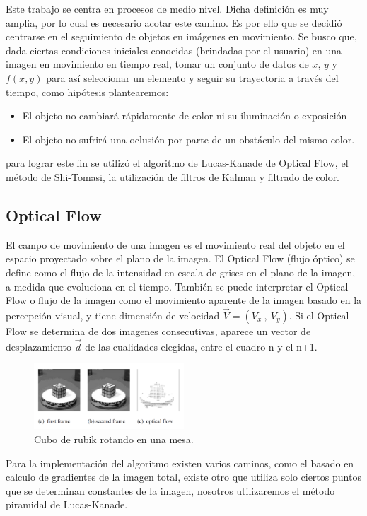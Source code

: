 Este trabajo se centra en procesos de medio nivel. Dicha definición es muy amplia, por lo cual es necesario acotar este camino. Es por ello que se decidió centrarse en el seguimiento de objetos en imágenes en movimiento. Se busco que, dada ciertas condiciones iniciales conocidas (brindadas por el usuario) en una imagen en movimiento en tiempo real, tomar un conjunto de datos de $x$, $y$ y $f(x,y)$ para así seleccionar un elemento y seguir su trayectoria a través del tiempo, como hipótesis plantearemos:
\begin{itemize}
\item El objeto no cambiará rápidamente de color ni su iluminación o exposición-
\item El objeto no sufrirá una oclusión por parte de un obstáculo del mismo color.
\end{itemize} para lograr este fin se utilizó el algoritmo de Lucas-Kanade de Optical Flow, el método de Shi-Tomasi, la utilización de filtros de Kalman y filtrado de color.
\subsection{Optical Flow} 
El campo de movimiento de una imagen es el movimiento real del objeto en el espacio proyectado sobre el plano de la imagen. El Optical Flow (flujo óptico) se define como el flujo de la intensidad en escala de grises en el plano de la imagen, a medida que evoluciona en el tiempo. También se puede interpretar el Optical Flow o flujo de la imagen como el movimiento aparente de la imagen  basado en la percepción visual, y tiene dimensión de velocidad $\vec{V}= (V_x \ , \ V_y)$. Si el Optical Flow se determina de dos imagenes consecutivas, aparece un vector de desplazamiento $\vec{d}$ de las cualidades elegidas, entre el cuadro n y el n+1.
\begin{figure}[H]
		\centering
		\includegraphics[width=0.5\textwidth]{Imagenes/opticalflowrubick.png}
		\caption{Cubo de rubik rotando en una mesa.}
		\label{fig:opticalflow1}
\end{figure}
Para la implementación del algoritmo existen varios caminos, como el basado en calculo de gradientes de la imagen total, existe otro que utiliza solo ciertos puntos que se determinan constantes de la imagen, nosotros utilizaremos el método piramidal de Lucas-Kanade.

